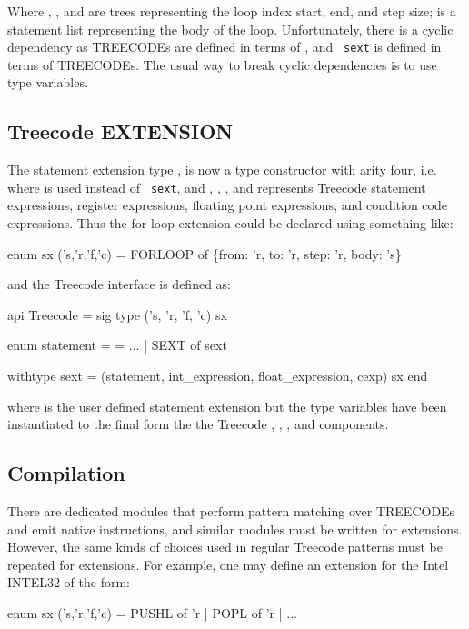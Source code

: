 Where , , and  are  trees representing
the loop index start, end, and step size;   is a statement list
representing the body of the loop. Unfortunately, there is a cyclic
dependency as TREECODEs are defined in terms of , and {\tt
sext} is defined in terms of TREECODEs. The usual way to break
cyclic dependencies is to use type variables. 

\subsection{Treecode EXTENSION}

The statement extension type , is now a type constructor
with arity four, i.e. 
 where  is used instead of {\tt
sext}, and , , , and  represents
Treecode statement expressions, register expressions, floating point
expressions, and condition code expressions. Thus the for-loop
extension could be declared using something like:
\begin{SML}
  enum sx ('s,'r,'f,'c) 
    = FORLOOP of \{from: 'r, to: 'r, step: 'r, body: 's\}
\end{SML}
and the Treecode interface is defined as:
\begin{SML}
  api Treecode = sig
    type ('s, 'r, 'f, 'c) sx

    enum statement =
      = ...
      | SEXT of sext

   withtype sext = (statement, int_expression, float_expression, cexp) sx
  end
\end{SML}

where  is the user defined statement extension but the
type variables have been instantiated to the final form the the Treecode 
, , , and  components. 

\subsection{Compilation}

There are dedicated modules that perform pattern matching over TREECODEs 
and emit native instructions, and similar modules must be written for
extensions.  However, the same kinds of choices used in regular Treecode 
patterns must be repeated for extensions. For example, one may define
an extension for the Intel INTEL32 of the form:

\begin{SML}
  enum sx ('s,'r,'f,'c) = PUSHL of 'r | POPL of 'r | ...
\end{SML}

